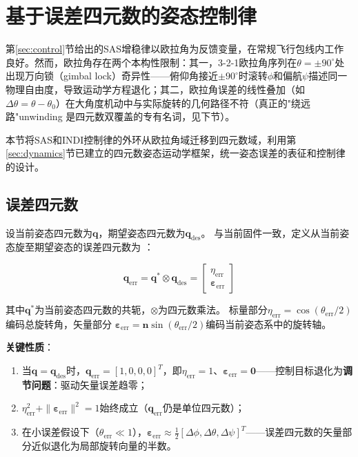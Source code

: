 \section{基于误差四元数的姿态控制律}
\label{sec:quat_control}

第\ref{sec:control}节给出的SAS增稳律以欧拉角为反馈变量，在常规飞行包线内工作良好。然而，欧拉角存在两个本构性限制：其一，3-2-1欧拉角序列在$\theta=\pm90^\circ$处出现万向锁（gimbal lock）奇异性——俯仰角接近$\pm90^\circ$时滚转$\phi$和偏航$\psi$描述同一物理自由度，导致运动学方程退化；其二，欧拉角误差的线性叠加（如$\Delta\theta = \theta - \theta_0$）在大角度机动中与实际旋转的几何路径不符（真正的"绕远路"unwinding 是四元数双覆盖的专有名词，见下节）。

本节将SAS和INDI控制律的外环从欧拉角域迁移到四元数域，利用第\ref{sec:dynamics}节已建立的四元数姿态运动学框架，统一姿态误差的表征和控制律的设计。

\subsection{误差四元数}

设当前姿态四元数为$\mathbf q$，期望姿态四元数为$\mathbf q_{\mathrm{des}}$。
与当前固件一致，定义从当前姿态旋至期望姿态的误差四元数为
\cite{markley2014fundamentals,kuipers1999quaternions}：

\begin{equation}
    \mathbf{q}_{\text{err}} = \mathbf{q}^{*} \otimes \mathbf{q}_{\text{des}}
    = \begin{bmatrix} \eta_{\text{err}} \\ \boldsymbol{\varepsilon}_{\text{err}} \end{bmatrix}
    \label{eq:quat_err}
\end{equation}

其中$\mathbf q^*$为当前姿态四元数的共轭，$\otimes$为四元数乘法。
标量部分$\eta_{\mathrm{err}}=\cos(\theta_{\mathrm{err}}/2)$编码总旋转角，矢量部分
$\boldsymbol\varepsilon_{\mathrm{err}}=\mathbf n\sin(\theta_{\mathrm{err}}/2)$编码当前姿态系中的旋转轴。

\textbf{关键性质}：
\begin{enumerate}[label=(\arabic*)]
    \item 当$\mathbf{q} = \mathbf{q}_{\text{des}}$时，$\mathbf{q}_{\text{err}} = [1, 0, 0, 0]^T$，即$\eta_{\text{err}}=1$、$\boldsymbol{\varepsilon}_{\text{err}} = \mathbf{0}$——控制目标退化为\textbf{调节问题}：驱动矢量误差趋零；
    \item $\eta_{\text{err}}^2 + \|\boldsymbol{\varepsilon}_{\text{err}}\|^2 = 1$始终成立（$\mathbf{q}_{\text{err}}$仍是单位四元数）；
    \item 在小误差假设下（$\theta_{\text{err}} \ll 1$），$\boldsymbol{\varepsilon}_{\text{err}} \approx \frac{1}{2}[\Delta\phi, \Delta\theta, \Delta\psi]^T$——误差四元数的矢量部分近似退化为局部旋转向量的半数\cite{fresk2013full}。
\end{enumerate}

